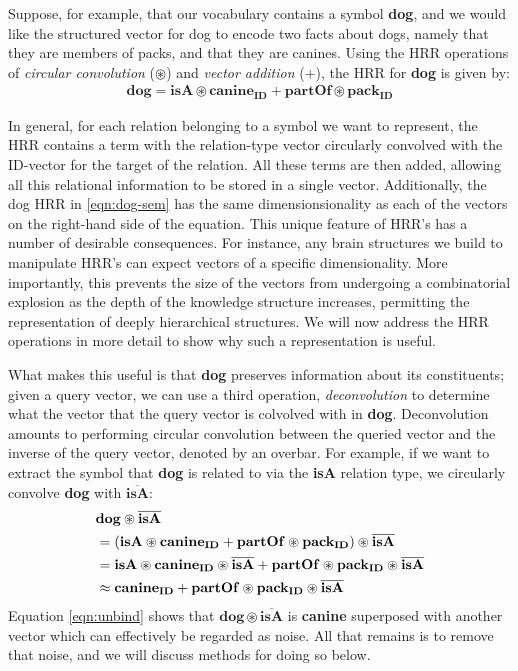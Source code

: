 \documentclass[10pt,letterpaper]{article}
\begin{document}
Suppose, for example, that our vocabulary contains a symbol \textbf{dog}, and we would like the structured vector for dog to encode two facts about dogs, namely that they are members of packs, and that they are canines. Using the HRR operations of \textit{circular convolution} ($\circledast$) and \textit{vector addition} ($+$), the HRR for \textbf{dog} is given by:
\begin{align}
  \mathbf{dog} = \mathbf{isA} \circledast \mathbf{canine_{ID}} + \mathbf{partOf} \circledast \mathbf{pack_{ID}}\label{eqn:dog-sem}
\end{align}

In general, for each relation belonging to a symbol we want to represent, the HRR contains a term with the relation-type vector circularly convolved with the ID-vector for the target of the relation. All these terms are then added, allowing all this relational information to be stored in a single vector. Additionally, the dog HRR in \eqref{eqn:dog-sem} has the same dimensionsionality as each of the vectors on the right-hand side of the equation. This unique feature of HRR's has a number of desirable consequences. For instance, any brain structures we build to manipulate HRR's can expect vectors of a specific dimensionality. More importantly, this prevents the size of the vectors from undergoing a combinatorial explosion as the depth of the knowledge structure increases, permitting the representation of deeply hierarchical structures. We will now address the HRR operations in more detail to show why such a representation is useful.

What makes this useful is that \textbf{dog} preserves information about its constituents; given a query vector, we can use a third operation, \textit{deconvolution} to determine what the vector that the query vector is colvolved with in \textbf{dog}. Deconvolution amounts to performing circular convolution between the queried vector and the inverse of the query vector, denoted by an overbar. For example, if we want to extract the symbol that \textbf{dog} is related to via the \textbf{isA} relation type, we circularly convolve \textbf{dog} with $\overline{\mathbf{isA}}$:
\begin{align}
&\mathbf{dog} \circledast \overline{\mathbf{isA} }\notag\\
&=(\mathbf{isA} \circledast \mathbf{canine_{ID}} + \mathbf{partOf} \circledast \mathbf{pack_{ID}}) \circledast \overline{\mathbf{isA} }\notag\\
&=\mathbf{isA} \circledast \mathbf{canine_{ID}} \circledast \overline{\mathbf{isA} } + \mathbf{partOf} \circledast \mathbf{pack_{ID}} \circledast \overline{\mathbf{isA} }\notag\\
&\approx \mathbf{canine_{ID}} + \mathbf{partOf} \circledast \mathbf{pack_{ID}} \circledast \overline{\mathbf{isA} }\label{eqn:unbind}
\end{align}
Equation \eqref{eqn:unbind} shows that $\mathbf{dog \circledast \overline{isA}}$ is \textbf{canine} superposed with another vector which can effectively be regarded as noise. All that remains is to remove that noise, and we will discuss methods for doing so below.
\end{document}
